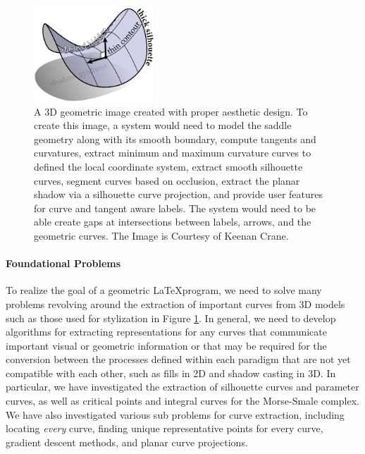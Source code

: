 \documentclass[12pt, letterpaper]{article}
\begin{document}
	\begin{figure}[h]
	\centering
	\includegraphics[width=0.4\textwidth]{StylizedFigure}
	\caption{A 3D geometric image created with proper aesthetic design. To create this image, a system would need to model the saddle geometry along
	with its smooth boundary, compute tangents and curvatures,
	extract minimum and maximum curvature curves to defined the local coordinate system, extract smooth silhouette curves, segment curves based on occlusion,
	extract the planar shadow via a silhouette curve projection, and provide user features for curve and tangent aware labels.
	The system would need to be able create gaps at intersections between labels, arrows, and the geometric curves.
	The Image is Courtesy of Keenan Crane.}
	\label{fig:keenan_style}
	\end{figure}

\newpage

	\paragraph{Foundational Problems}
	To realize the goal of a geometric \LaTeX program, we need to solve many problems revolving around the extraction of important curves from 3D models
	such as those used for stylization in Figure \ref{fig:keenan_style}. In general, we need to develop algorithms for extracting representations for any curves
	that communicate important visual or geometric information or that may be required for the conversion between the processes defined within each paradigm
	that are not yet compatible with each other, such as fills in 2D and shadow casting in 3D. In particular, we have investigated the extraction of silhouette curves and parameter curves,
	as well as critical points and integral curves for the Morse-Smale complex. We have also investigated various sub problems for curve extraction,
	including locating \emph{every} curve, finding unique representative points for every curve, gradient descent methods, and planar curve projections.

\newpage
\end{document}
